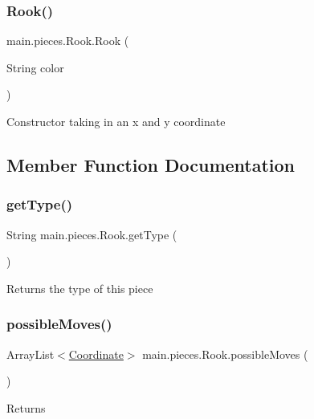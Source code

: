 \subsubsection{\texorpdfstring{Rook()}{Rook()}}
{\footnotesize\ttfamily main.\+pieces.\+Rook.\+Rook (\begin{DoxyParamCaption}\item[{String}]{color }\end{DoxyParamCaption})}

Constructor taking in an x and y coordinate 

\subsection{Member Function Documentation}
\hypertarget{classmain_1_1pieces_1_1_rook_aa92d82c81ad259daa0a3722e6bba870c}{}\label{classmain_1_1pieces_1_1_rook_aa92d82c81ad259daa0a3722e6bba870c} 
\subsubsection{\texorpdfstring{get\+Type()}{getType()}}
{\footnotesize\ttfamily String main.\+pieces.\+Rook.\+get\+Type (\begin{DoxyParamCaption}{ }\end{DoxyParamCaption})}

Returns the type of this piece \hypertarget{classmain_1_1pieces_1_1_rook_acadd8cb22ffb2aef8ce68502b221a96e}{}\label{classmain_1_1pieces_1_1_rook_acadd8cb22ffb2aef8ce68502b221a96e} 
\subsubsection{\texorpdfstring{possible\+Moves()}{possibleMoves()}}
{\footnotesize\ttfamily Array\+List$<$\hyperlink{classmain_1_1model_1_1_coordinate}{Coordinate}$>$ main.\+pieces.\+Rook.\+possible\+Moves (\begin{DoxyParamCaption}{ }\end{DoxyParamCaption})}

\begin{DoxyReturn}{Returns}

\end{DoxyReturn}
\hypertarget{classmain_1_1pieces_1_1_rook_aa4408e34efd361045d25687da3103103}{}\label{classmain_1_1pieces_1_1_rook_aa4408e34efd361045d25687da3103103} 
